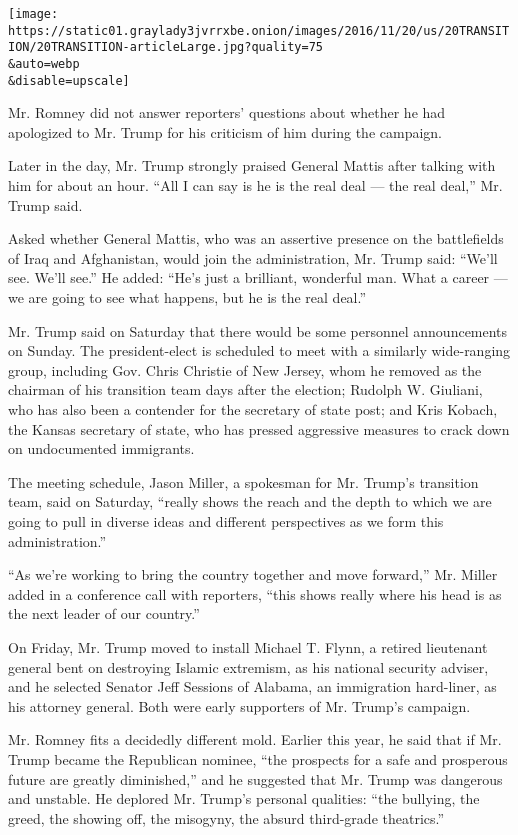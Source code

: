 \texttt{[image: https://static01.graylady3jvrrxbe.onion/images/2016/11/20/us/20TRANSITION/20TRANSITION-articleLarge.jpg?quality=75\\\&auto=webp\\\&disable=upscale]}

Mr. Romney did not answer reporters' questions about whether he had
apologized to Mr. Trump for his criticism of him during the campaign.

Later in the day, Mr. Trump strongly praised General Mattis after
talking with him for about an hour. ``All I can say is he is the real
deal --- the real deal,'' Mr. Trump said.

Asked whether General Mattis, who was an assertive presence on the
battlefields of Iraq and Afghanistan, would join the administration, Mr.
Trump said: ``We'll see. We'll see.'' He added: ``He's just a brilliant,
wonderful man. What a career --- we are going to see what happens, but
he is the real deal.''

Mr. Trump said on Saturday that there would be some personnel
announcements on Sunday. The president-elect is scheduled to meet with a
similarly wide-ranging group, including Gov. Chris Christie of New
Jersey, whom he removed as the chairman of his transition team days
after the election; Rudolph W. Giuliani, who has also been a contender
for the secretary of state post; and Kris Kobach, the Kansas secretary
of state, who has pressed aggressive measures to crack down on
undocumented immigrants.

The meeting schedule, Jason Miller, a spokesman for Mr. Trump's
transition team, said on Saturday, ``really shows the reach and the
depth to which we are going to pull in diverse ideas and different
perspectives as we form this administration.''

``As we're working to bring the country together and move forward,'' Mr.
Miller added in a conference call with reporters, ``this shows really
where his head is as the next leader of our country.''

On Friday, Mr. Trump moved to install Michael T. Flynn, a retired
lieutenant general bent on destroying Islamic extremism, as his national
security adviser, and he selected Senator Jeff Sessions of Alabama, an
immigration hard-liner, as his attorney general. Both were early
supporters of Mr. Trump's campaign.

Mr. Romney fits a decidedly different mold. Earlier this year, he said
that if Mr. Trump became the Republican nominee, ``the prospects for a
safe and prosperous future are greatly diminished,'' and he suggested
that Mr. Trump was dangerous and unstable. He deplored Mr. Trump's
personal qualities: ``the bullying, the greed, the showing off, the
misogyny, the absurd third-grade theatrics.''

